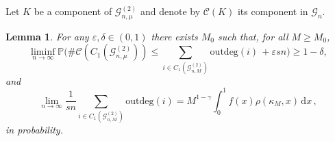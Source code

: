 \documentclass[12pt,a4paper]{article}
\newcommand\marginal[1]{\marginpar{\raggedright\parindent=0pt\tiny #1}}
\newcommand{\pmar}[1]{\marginal{\color{red}#1}}
\numberwithin{equation}{section}
\newtheorem{lemma}[shared]{Lemma}
\begin{document}

Let $K$ be a component of $\mathcal G^{(2)}_{n,\mu}$ and denote by $\mathcal C(K)$ its component in $\mathscr G_n$. 

\begin{lemma}\label{uppersuper}
    For any $\varepsilon,\delta\in(0,1)$ there exists $M_0$  such that, for all $M\ge M_0$,
    $$\liminf_{n\to\infty}\mathbb P\Big(\#\mathcal C(C_1(\mathcal G^{(2)}_{n,\mu})) \le  \sum_{i\in C_1(\mathcal G^{(2)}_{n,M})} {\mathrm{outdeg}}(i) \,+\varepsilon sn\Big) \ge 1-\delta,$$
    and 
    $$\lim_{n\to\infty} \frac{1}{sn}\sum_{i\in C_1(\mathcal G^{(2)}_{n,M})} {\mathrm{outdeg}}(i)  =
     M^{1-\gamma} \int_0^1 f(x) \rho(\kappa_M , x)\,\text{d}x\,,$$
     in probability.
\end{lemma}
\end{document}
